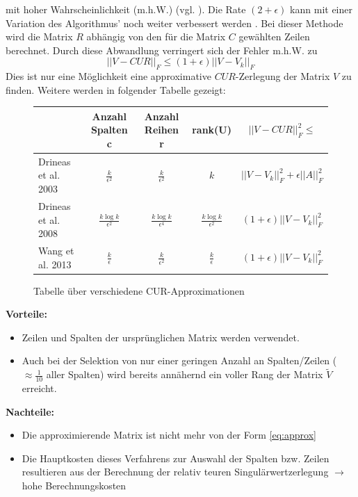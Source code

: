 \documentclass[12pt,a4paper,twoside]{article}
\begin{document}
		mit hoher Wahrscheinlichkeit (m.h.W.) (vgl. \citep{mahoney2008}). \newline
		\newline
		Die Rate $(2+\epsilon)$ kann mit einer Variation des Algorithmus' noch weiter verbessert werden \citep{Drineas2009}. Bei dieser Methode wird die Matrix $R$ abhängig von den für die Matrix $C$ gewählten Zeilen berechnet. Durch diese Abwandlung verringert sich der Fehler m.h.W. zu
		\begin{equation*}
			||V-CUR||_F\leq (1+\epsilon)||V-V_k||_F
		\end{equation*}
		Dies ist nur eine Möglichkeit eine approximative $CUR$-Zerlegung der Matrix $V$ zu finden. Weitere werden in 
		folgender Tabelle gezeigt: \newline
		\begin{figure}[h]
			\begin{tabular}{l||c|c|c|c}
		 		& Anzahl Spalten c & Anzahl Reihen r & rank(U) & $||V-CUR||_F^2\leq$ \\
		 		\hline \hline
		 		Drineas et al. 2003 \citep{drineas2003} & $\frac{k}{\epsilon^2}$ & $\frac{k}{\epsilon^2}$ & $k$ & $||V-V_k||_F^2+\epsilon||A||^2_F$ \\
		 		\hline
		 		Drineas et al. 2008 \citep{Drineas2009} & $\frac{k\log k}{\epsilon^2}$ & $\frac{k\log k}{\epsilon^4}$ & $\frac{k\log k}{\epsilon^2}$ & $(1+\epsilon)||V-V_k||^2_F$ \\
		 		\hline
		 		Wang et al. 2013 \citep{Wang2013}& $\frac{k}{\epsilon}$ & $\frac{k}{\epsilon^2}$ & $\frac{k}{\epsilon}$ & $(1+\epsilon)||V-V_k||^2_F$
			\end{tabular}
			\caption{Tabelle über verschiedene CUR-Approximationen}
		\end{figure}
		
		\textbf{Vorteile:}
		\begin{itemize}
			\item Zeilen und Spalten der ursprünglichen Matrix werden verwendet.
			\item Auch bei der Selektion von nur einer geringen Anzahl an Spalten/Zeilen ($\approx\frac{1}{10}$ aller Spalten) wird bereits annähernd ein voller Rang der Matrix $\tilde{V}$ erreicht.
		\end{itemize}
		\textbf{Nachteile:} 
		\begin{itemize}
			\item Die approximierende Matrix ist nicht mehr von der Form \ref{eq:approx}
			\item Die Hauptkosten dieses Verfahrens zur Auswahl der Spalten bzw. Zeilen resultieren aus der Berechnung der relativ teuren Singulärwertzerlegung $\rightarrow$ hohe Berechnungskosten
		\end{itemize}
		
\end{document}
